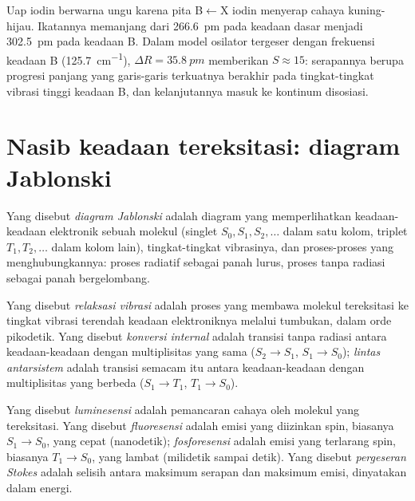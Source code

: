\begin{example}[Iodin]\label{ex:b3:electronic-spectroscopy:iodine}
Uap iodin berwarna ungu karena pita B$\leftarrow$X iodin menyerap cahaya
kuning-hijau. Ikatannya memanjang dari \qty{266.6}{pm} pada keadaan dasar
menjadi \qty{302.5}{pm} pada keadaan B. Dalam model osilator tergeser dengan
frekuensi keadaan B (\qty{125.7}{cm^{-1}}), $\Delta R = \qty{35.8}{pm}$ memberikan
$S \approx 15$: serapannya berupa progresi panjang yang garis-garis terkuatnya
berakhir pada tingkat-tingkat vibrasi tinggi keadaan B, dan kelanjutannya
masuk ke kontinum disosiasi.
\end{example}

\section{Nasib keadaan tereksitasi: diagram Jablonski}

\begin{definition}\label{def:b3:electronic-spectroscopy:jablonski}
Yang disebut \emph{diagram Jablonski} adalah diagram
yang memperlihatkan keadaan-keadaan elektronik sebuah molekul (singlet
$S_0, S_1, S_2, \dots$ dalam satu kolom, triplet $T_1, T_2,
\dots$ dalam kolom lain), tingkat-tingkat vibrasinya, dan proses-proses yang
menghubungkannya: proses radiatif sebagai panah lurus, proses tanpa radiasi
sebagai panah bergelombang.
\end{definition}

\begin{definition}\label{def:b3:electronic-spectroscopy:radiationless}
Yang disebut \emph{relaksasi vibrasi} adalah proses
yang membawa molekul tereksitasi ke tingkat vibrasi terendah keadaan
elektroniknya melalui tumbukan, dalam orde pikodetik. Yang disebut
\emph{konversi internal} adalah transisi tanpa
radiasi antara keadaan-keadaan dengan multiplisitas yang sama ($S_2 \to S_1$,
$S_1 \to S_0$); \emph{lintas antarsistem} adalah
transisi semacam itu antara keadaan-keadaan dengan multiplisitas yang berbeda
($S_1 \to T_1$, $T_1 \to S_0$).
\end{definition}

\begin{definition}\label{def:b3:electronic-spectroscopy:luminescence}
Yang disebut \emph{luminesensi} adalah pemancaran cahaya
oleh molekul yang tereksitasi. Yang disebut \emph{fluoresensi}
adalah emisi yang diizinkan spin, biasanya $S_1 \to S_0$, yang cepat
(nanodetik); \emph{fosforesensi} adalah emisi yang
terlarang spin, biasanya $T_1 \to S_0$, yang lambat (milidetik sampai
detik). Yang disebut \emph{pergeseran Stokes} adalah
selisih antara maksimum serapan dan maksimum emisi, dinyatakan dalam energi.
\end{definition}

